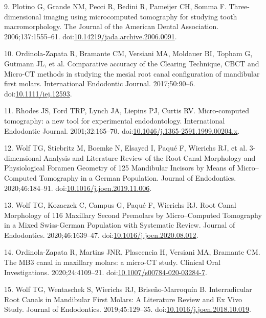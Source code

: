 \documentclass[
  american,
]{article}
\newenvironment{cslreferences}%
  {}%
  {\par}
\begin{document}
\begin{cslreferences}
\leavevmode\hypertarget{ref-pTcCEU9H}{}%
9. Plotino G, Grande NM, Pecci R, Bedini R, Pameijer CH, Somma F. Three-dimensional imaging using microcomputed tomography for studying tooth macromorphology. The Journal of the American Dental Association. 2006;137:1555--61. doi:\href{https://doi.org/10.14219/jada.archive.2006.0091}{10.14219/jada.archive.2006.0091}.

\leavevmode\hypertarget{ref-PQ2tbZFC}{}%
10. Ordinola-Zapata R, Bramante CM, Versiani MA, Moldauer BI, Topham G, Gutmann JL, et al. Comparative accuracy of the Clearing Technique, CBCT and Micro-CT methods in studying the mesial root canal configuration of mandibular first molars. International Endodontic Journal. 2017;50:90--6. doi:\href{https://doi.org/10.1111/iej.12593}{10.1111/iej.12593}.

\leavevmode\hypertarget{ref-19T8cyNhk}{}%
11. Rhodes JS, Ford TRP, Lynch JA, Liepins PJ, Curtis RV. Micro‐computed tomography: a new tool for experimental endodontology. International Endodontic Journal. 2001;32:165--70. doi:\href{https://doi.org/10.1046/j.1365-2591.1999.00204.x}{10.1046/j.1365-2591.1999.00204.x}.

\leavevmode\hypertarget{ref-OttTicsv}{}%
12. Wolf TG, Stiebritz M, Boemke N, Elsayed I, Paqué F, Wierichs RJ, et al. 3-dimensional Analysis and Literature Review of the Root Canal Morphology and Physiological Foramen Geometry of 125 Mandibular Incisors by Means of Micro--Computed Tomography in a German Population. Journal of Endodontics. 2020;46:184--91. doi:\href{https://doi.org/10.1016/j.joen.2019.11.006}{10.1016/j.joen.2019.11.006}.

\leavevmode\hypertarget{ref-19SVNdOdA}{}%
13. Wolf TG, Kozaczek C, Campus G, Paqué F, Wierichs RJ. Root Canal Morphology of 116 Maxillary Second Premolars by Micro--Computed Tomography in a Mixed Swiss-German Population with Systematic Review. Journal of Endodontics. 2020;46:1639--47. doi:\href{https://doi.org/10.1016/j.joen.2020.08.012}{10.1016/j.joen.2020.08.012}.

\leavevmode\hypertarget{ref-RUBxFFUa}{}%
14. Ordinola-Zapata R, Martins JNR, Plascencia H, Versiani MA, Bramante CM. The MB3 canal in maxillary molars: a micro-CT study. Clinical Oral Investigations. 2020;24:4109--21. doi:\href{https://doi.org/10.1007/s00784-020-03284-7}{10.1007/s00784-020-03284-7}.

\leavevmode\hypertarget{ref-amSKhLb1}{}%
15. Wolf TG, Wentaschek S, Wierichs RJ, Briseño-Marroquín B. Interradicular Root Canals in Mandibular First Molars: A Literature Review and Ex Vivo Study. Journal of Endodontics. 2019;45:129--35. doi:\href{https://doi.org/10.1016/j.joen.2018.10.019}{10.1016/j.joen.2018.10.019}.


\end{cslreferences}
\end{document}
